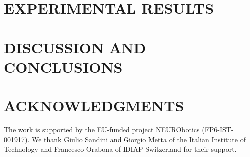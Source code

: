 \documentclass{article}
\begin{document}
\section{EXPERIMENTAL RESULTS}
\label{sec:res}


\section{DISCUSSION AND CONCLUSIONS}
\label{sec:concl}


\section*{ACKNOWLEDGMENTS}

The work is supported by the EU-funded project NEURObotics
(FP6-IST-001917). We thank Giulio Sandini and Giorgio Metta of the
Italian Institute of Technology and Francesco Orabona of IDIAP
Switzerland for their support.


{\small


}
\end{document}
